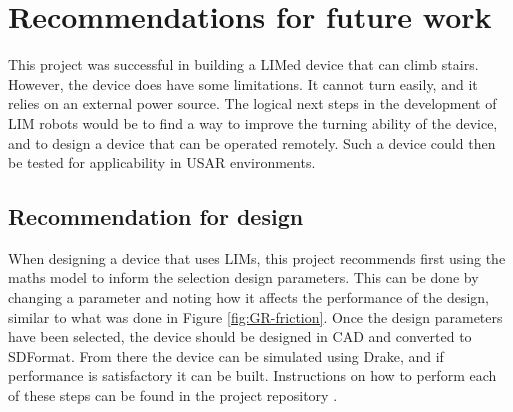 \chapter{Recommendations for future work}

This project was successful in building a LIMed device that can climb stairs. However, the device does have some limitations. It cannot turn easily, and it relies on an external power source. The logical next steps in the development of LIM robots would be to find a way to improve the turning ability of the device, and to design a device that can be operated remotely. Such a device could then be tested for applicability in USAR environments.


\section{Recommendation for design}

When designing a device that uses LIMs, this project recommends first using the maths model to inform the selection design parameters. This can be done by changing a parameter and noting how it affects the performance of the design, similar to what was done in Figure \ref{fig:GR-friction}. Once the design parameters have been selected, the device should be designed in CAD and converted to SDFormat. From there the device can be simulated using Drake, and if performance is satisfactory it can be built. Instructions on how to perform each of these steps can be found in the project repository \citep{repo}.\\

